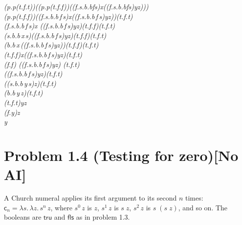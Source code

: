 \documentclass[11pt]{article}
\newenvironment{reasoning}[1][Justification]%
  {\par\noindent{\bfseries\color{solution}#1.}%
   \begin{mdframed}[style=reasonbox]\color{solution}}%
  {\end{mdframed}}
\newcommand{\enc}[1]{\mathsf{#1}}
\newcommand{\noai}{\textcolor{BrickRed}{\textbf{[No AI]}}}
\begin{document}
\begin{reasoning}[Derivation for (c)]
  \emph{
  (\lambda p.p(\lambda t.\lambda f.t))((\lambda p.p(\lambda t.\lambda f.f))((\lambda f.\lambda s.\lambda b.b\;f\;s)x((\lambda f.\lambda s.\lambda b.b\;f\;s)\;y\;z)))
  \\
  \to
  (\lambda p.p(\lambda t.\lambda f.f))((\lambda f.\lambda s.\lambda b.b\,f\,s)\;x\;((\lambda f.\lambda s.\lambda b.b\,f\,s)\;y\;z))(\lambda t.\lambda f.t)
  \\
  \to
  (\lambda f.\lambda s.\lambda b.b\,f\,s)\;x  ((\lambda f.\lambda s.\lambda b.b\,f\,s)\;y\;z)(\lambda t.\lambda f.f)(\lambda t.\lambda f.t)
  \\
  \to
  (\lambda s.\lambda b.b\,x\,s)((\lambda f.\lambda s.\lambda b.b\,f\,s)\;y\;z)(\lambda t.\lambda f.f)(\lambda t.\lambda f.t)
  \\
  \to
  (\lambda b.b\,x\,((\lambda f.\lambda s.\lambda b.b\,f\,s)\;y\;z))(\lambda t.\lambda f.f)(\lambda t.\lambda f.t)
  \\
  \to
  (\lambda t.\lambda f.f)\;x((\lambda f.\lambda s.\lambda b.b\,f\,s)\;y\;z)(\lambda t.\lambda f.t)
  \\
  \to
  (\lambda f.f) ((\lambda f.\lambda s.\lambda b.b\,f\,s)\;y\;z) (\lambda t.\lambda f.t)
  \\
  \to
  ((\lambda f.\lambda s.\lambda b.b\,f\,s)\;y\;z)(\lambda t.\lambda f.t)
  \\
  \to
  ((\lambda s.\lambda b.b\,y\,s)\;z)(\lambda t.\lambda f.t)
  \\
  \to
  (\lambda b.b\,y\,z)(\lambda t.\lambda f.t)
  \\
  \to
  (\lambda t.\lambda f.t)\;y\;z
  \\
  \to
  (\lambda f.y)\;z
  \\
  \to 
  y
  }
\end{reasoning}

\clearpage
\section*{Problem 1.4 (Testing for zero)\quad\normalsize\noai}

A Church numeral applies its first argument to its second $n$ times:
$\enc{c}_n = \lambda s.\, \lambda z.\, s^n\,z$, where $s^0\,z$ is $z$,
$s^1\,z$ is $s\;z$, $s^2\,z$ is $s\;(s\;z)$, and so on. The booleans are
$\enc{tru}$ and $\enc{fls}$ as in problem 1.3.
\end{document}
